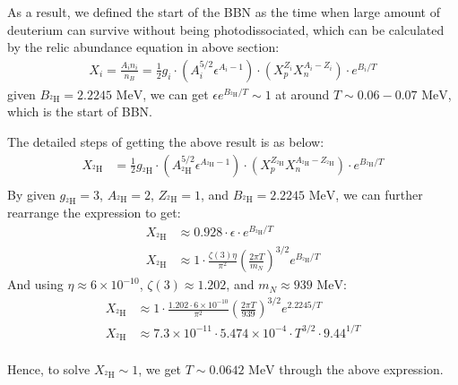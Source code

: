 \bigskip \noindent
\begin{theory}
    As a result, we defined the start of the BBN as the time when large amount of deuterium can survive without being photodissociated, which can be calculated by the relic abundance equation in above section:
    \begin{align*}
         X_i = \frac{A_i n_i}{n_B} = \frac{1}{2}g_i \cdot \left(A_i^{5/2} \epsilon^{A_i - 1}\right) \cdot \left( X_p^{Z_i} X_n^{A_i - Z_i} \right) \cdot e^{B_i / T}
    \end{align*}
    given $B_{{}^2\text{H}} = 2.2245 \text{ MeV}$, we can get $\epsilon e^{B_{{}^2\text{H}} / T} \sim 1$ at around $T \sim 0.06 - 0.07 \text{ MeV}$, which is the start of BBN.
\end{theory}

\bigskip \noindent
\begin{foundation}
    The detailed steps of getting the above result is as below:
    \begin{align*}
        X_{{}^2\text{H}} &= \frac{1}{2}g_{{}^2\text{H}} \cdot \left(A_{{}^2\text{H}}^{5/2} \epsilon^{A_{{}^2\text{H}} - 1}\right) \cdot \left( X_p^{Z_{{}^2\text{H}}} X_n^{A_{{}^2\text{H}} - Z_{{}^2\text{H}}} \right) \cdot e^{B_{{}^2\text{H}} / T} \\
    \end{align*}
    By given $g_{{}^2\text{H}} = 3$, $A_{{}^2\text{H}} = 2$, $Z_{{}^2\text{H}} = 1$, and $B_{{}^2\text{H}} = 2.2245 \text{ MeV}$, we can further rearrange the expression to get:
    \begin{align*}
        X_{{}^2\text{H}} &\approx 0.928 \cdot \epsilon \cdot e^{B_{{}^2\text{H}} / T} \\
         X_{{}^2\text{H}} &\approx 1 \cdot \frac{\zeta(3) \eta}{\pi^2} \left( \frac{2\pi T}{m_N} \right)^{3/2} e^{B_{{}^2\text{H}} / T}
    \end{align*}
    And using $\eta \approx 6 \times 10^{-10}$, $\zeta(3) \approx 1.202$, and $m_N \approx 939 \text{ MeV}$:
    \begin{align*}
        X_{{}^2\text{H}} &\approx 1 \cdot \frac{1.202 \cdot 6 \times 10^{-10}}{\pi^2} \left( \frac{2\pi T}{939} \right)^{3/2} e^{2.2245 / T} \\
        X_{{}^2\text{H}} &\approx 7.3 \times 10^{-11} \cdot 5.474 \times 10^{-4} \cdot T^{3/2} \cdot 9.44^{1/T} \\
    \end{align*}

    Hence, to solve $X_{{}^2\text{H}} \sim 1$, we get $T \sim 0.0642 \text{ MeV}$ through the above expression.
\end{foundation}

